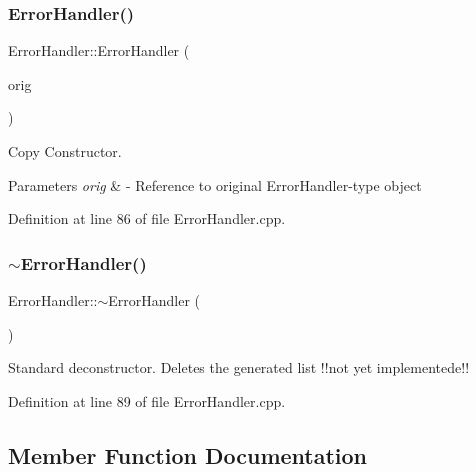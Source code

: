 \subsubsection{\texorpdfstring{ErrorHandler()}{ErrorHandler()}\hspace{0.1cm}{\footnotesize\ttfamily [2/2]}}
{\footnotesize\ttfamily Error\+Handler\+::\+Error\+Handler (\begin{DoxyParamCaption}\item[{const \mbox{\hyperlink{classErrorHandler}{Error\+Handler}} \&}]{orig }\end{DoxyParamCaption})}



Copy Constructor. 


\begin{DoxyParams}{Parameters}
{\em orig} & -\/ Reference to original Error\+Handler-\/type object \\
\hline
\end{DoxyParams}


Definition at line 86 of file Error\+Handler.\+cpp.

\mbox{\label{classErrorHandler_a73c7e690b864697e507aaeb537b3c3e5}} 
\subsubsection{\texorpdfstring{$\sim$ErrorHandler()}{~ErrorHandler()}}
{\footnotesize\ttfamily Error\+Handler\+::$\sim$\+Error\+Handler (\begin{DoxyParamCaption}{ }\end{DoxyParamCaption})\hspace{0.3cm}{\ttfamily [virtual]}}

Standard deconstructor. Deletes the generated list !!not yet implementede!! 

Definition at line 89 of file Error\+Handler.\+cpp.



\subsection{Member Function Documentation}
\mbox{\label{classErrorHandler_a3036b8ff4299ac0505b6b2ca6fab11a1}} 
